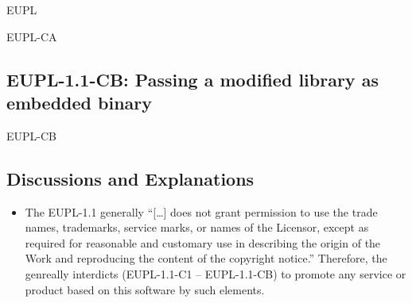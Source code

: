 \begin{license}{EUPL}
\begin{lsuc}{EUPL-CA}
\end{lsuc}

\subsection{EUPL-1.1-CB: Passing a modified library as embedded binary}
\begin{lsuc}{EUPL-CB}



  \begin{lsucrequires}
    \lsucmandatory{\keepLicensingElements \addWhenCompiling}
    \lsucmandatory{\giveLicense}\passingFilesCorrectly
    \lsucmandatory{\addModificationTextFile}
    \lsucmandatory{\makeAllSourcesAvailable}
    \lsucmandatory{\mentionRepositoryInDocumentation}
    \lsucmandatory{\arrangeBinaryModifications}
    \lsucmandatory{\applyCopyleftToBinaries}
    \lsucoptional{\markAllEmbeddedModifications}
    \lsucoptional{\addToYourCopyrightNotice}
  \end{lsucrequires}

  \begin{lsucprohibits}
    \lsucitem{\noTrademarks}
  \end{lsucprohibits}

\end{lsuc}

\subsection{Discussions and Explanations}
\label{EUPLDiscussion}
\begin{itemize}
  
\item The EUPL-1.1 generally \enquote{[\ldots] does not grant permission to use
  the trade names, trademarks, service marks, or names of the Licensor, except
  as required for reasonable and customary use in describing the origin of the
  Work and reproducing the content of the copyright notice.} 
  Therefore, the \oslic{} genreally interdicts (EUPL-1.1-C1 -- EUPL-1.1-CB) to promote any
  service or product based on this software by such elements. 


\end{itemize}
\end{license}
